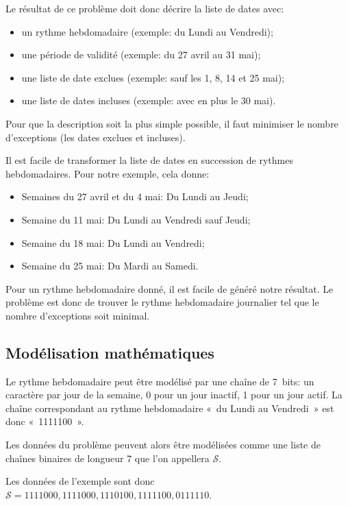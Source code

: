 \documentclass{roadef}
\def\S{\mathcal{S}}
\begin{document}
Le résultat de ce problème doit donc décrire la liste de dates avec:
\begin{itemize}
\item un rythme hebdomadaire (exemple: du Lundi au Vendredi);
\item une période de validité (exemple: du 27 avril au 31 mai);
\item une liste de date exclues (exemple: sauf les 1, 8, 14 et 25 mai);
\item une liste de dates incluses (exemple: avec en plus le 30 mai).
\end{itemize}

Pour que la description soit la plus simple possible, il faut
minimiser le nombre d'exceptions (les dates exclues et incluses).

Il est facile de transformer la liste de dates en succession de
rythmes hebdomadaires. Pour notre exemple, cela donne:
\begin{itemize}
\item Semaines du 27 avril et du 4 mai: Du Lundi au Jeudi;
\item Semaine du 11 mai: Du Lundi au Vendredi sauf Jeudi;
\item Semaine du 18 mai: Du Lundi au Vendredi;
\item Semaine du 25 mai: Du Mardi au Samedi.
\end{itemize}

Pour un rythme hebdomadaire donné, il est facile de généré notre
résultat.  Le problème est donc de trouver le rythme hebdomadaire
journalier tel que le nombre d'exceptions soit minimal.

\subsection{Modélisation mathématiques}

Le rythme hebdomadaire peut être modélisé par une chaîne de 7~bits: un
caractère par jour de la semaine, 0 pour un jour inactif, 1 pour un
jour actif. La chaîne correspondant au rythme hebdomadaire «~du Lundi
au Vendredi~» est donc «~1111100~».

Les données du problème peuvent alors être modélisées comme une liste
de chaînes binaires de longueur 7 que l'on appellera $\S$.

Les données de l'exemple sont donc
\begin{math}
  \S = 1111000, 1111000, 1110100, 1111100, 0111110
\end{math}.
\end{document}
